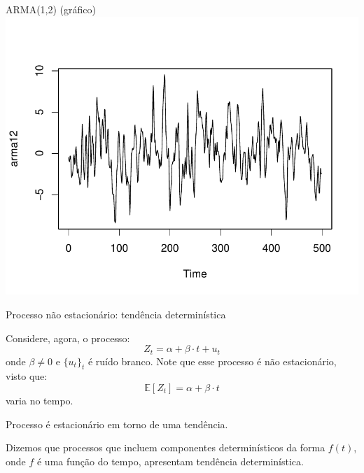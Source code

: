 \documentclass[11pt]{beamer}
\newenvironment{halfwideitemize}{\itemize\addtolength{\itemsep}{0.5em}}{\enditemize}
\begin{document}
\begin{frame}{ARMA(1,2) (gráfico)}
	\centering
	\includegraphics[scale=0.7]{graficos/arma12.pdf}
\end{frame}
\begin{frame}{Processo não estacionário: tendência determinística}
	\begin{halfwideitemize}
		\item Considere, agora, o processo:
		\begin{equation}
			\label{eq_trend}
			Z_t = \alpha + \beta \cdot t + u_t
		\end{equation}
		onde $\beta \neq 0$ e $\{u_t\}_t$ é ruído branco. Note que esse processo é {\color{blue}não estacionário}, visto que:
		\begin{equation*}
			\mathbb{E}[Z_t] = \alpha + \beta \cdot t
		\end{equation*}
		varia no tempo.
		\item Processo é estacionário {\color{blue} em torno de uma tendência}.
		\item Dizemos que processos que incluem componentes determinísticos da forma $f(t)$, onde $f$ é uma função do tempo, apresentam {\color{blue}tendência determinística}. 
	\end{halfwideitemize}
\end{frame}
\end{document}
